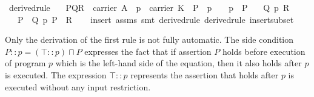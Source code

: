 \documentclass{llncs}
\begin{document}
\begin{isabellebody}
{\isafoldproof}%
%
\isadelimproof
\isanewline
%
\endisadelimproof
\isanewline
{}\isamarkupfalse%
\ derived{}rule{}{}\isanewline
\ \ \ {}{}P{}Q{}R{}\ {}\ carrier\ A{}\ \ {}p\ {}\ carrier\ K{}\ \ {}P\ {}\ p\ {}\ {}{}\ {}\ p{}\ {}\ P{}\isanewline
\ \ \ {}{}Q{}\ p\ {}R{}{}\isanewline
\ \ \ {}{}P\ {}\ Q{}\ p\ {}P\ {}\ R{}{}\isanewline
%
\isadelimproof
\ \ %
\endisadelimproof
%
\isatagproof
{}\isamarkupfalse%
\ {}insert\ assms{}\ {}smt\ derived{}rule{}\ derived{}rule{}\ insert{}subset{}%
\endisatagproof\isanewline
\end{isabellebody}

\noindent Only the derivation of the first rule is not fully
automatic. The side condition $P :: p = (\top :: p) \sqcap P$
expresses the fact that if assertion $P$ holds before execution of
program $p$ which is the left-hand side of the equation, then it also
holds after $p$ is executed. The expression $\top :: p$ represents the
assertion that holds after $p$ is executed without any input
restriction.
\end{document}
